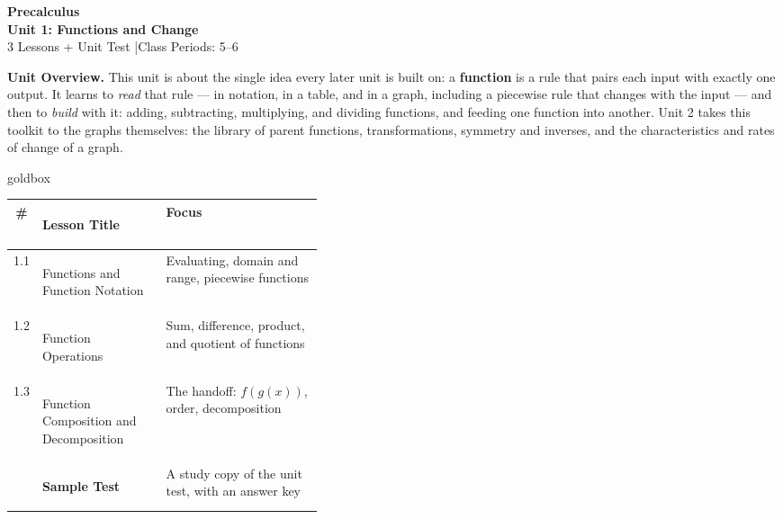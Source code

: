 \thispagestyle{empty}

\vspace{-0.82in}

\begin{center}
  {\color{white}\textbf{\LARGE Precalculus}}\\[6pt]
  {\color{lilacmid}\Large\textbf{Unit 1: Functions and Change}}\\[4pt]
  {\color{white}\small 3 Lessons + Unit Test \quad|\quad Class Periods: 5--6}
\end{center}

\vspace{0.20in}

\begin{tcolorbox}[colback=lilac, colframe=plum, boxrule=0.8pt, arc=2mm,
    left=3mm, right=3mm, top=2mm, bottom=2mm]
\small\textbf{Unit Overview.}
This unit is about the single idea every later unit is built on: a
\textbf{function} is a rule that pairs each input with exactly one output. It
learns to \emph{read} that rule --- in notation, in a table, and in a graph,
including a piecewise rule that changes with the input --- and then to
\emph{build} with it: adding, subtracting, multiplying, and dividing functions,
and feeding one function into another. Unit 2 takes this toolkit to the graphs
themselves: the library of parent functions, transformations, symmetry and
inverses, and the characteristics and rates of change of a graph.
\end{tcolorbox}

\vspace{0.13in}

\begin{skillbox}{goldbox}
\small
\renewcommand{\arraystretch}{1.42}
\begin{tabularx}{\linewidth}{@{} c >{\bfseries\raggedright\arraybackslash}p{0.40\linewidth} X @{}}
\rowcolor{lilac}
\textbf{\#} & \textbf{Lesson Title} & \textbf{Focus} \\
\midrule
1.1 & Functions and Function Notation & Evaluating, domain and range, piecewise functions \\
1.2 & Function Operations & Sum, difference, product, and quotient of functions \\
1.3 & Function Composition and Decomposition & The handoff: $f(g(x))$, order, decomposition \\
\midrule
\rowcolor{lilac}
    & \textbf{Sample Test} & A study copy of the unit test, with an answer key \\
\end{tabularx}
\end{skillbox}


